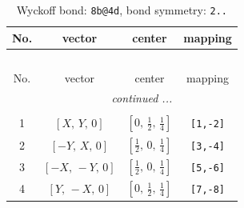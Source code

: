 \documentclass[fleqn,8pt]{jsarticle}
\begin{document}
\renewcommand{\arraystretch}{1.2}
\begin{longtable}{cccc}
\caption{Wyckoff bond: {\tt 8b@4d}, bond symmetry: {\tt 2..}}
 \\
 \hline \hline
No. & vector & center & mapping \\ \hline \endfirsthead

\multicolumn{3}{l}{\tablename\ \thetable{}} \\
 \hline \hline
No. & vector & center & mapping \\ \hline \endhead

 \hline \hline
\multicolumn{3}{r}{\footnotesize\it continued ...} \\ \endfoot

 \hline \hline
\multicolumn{3}{r}{} \\ \endlastfoot

1 & $\left[ X,\, Y,\, 0 \right]$ & $\left[ 0,\, \frac{1}{2},\, \frac{1}{4} \right]$ & {\tt [1,-2]} \\ \hline
2 & $\left[ - Y,\, X,\, 0 \right]$ & $\left[ \frac{1}{2},\, 0,\, \frac{1}{4} \right]$ & {\tt [3,-4]} \\ \hline
3 & $\left[ - X,\, - Y,\, 0 \right]$ & $\left[ \frac{1}{2},\, 0,\, \frac{1}{4} \right]$ & {\tt [5,-6]} \\ \hline
4 & $\left[ Y,\, - X,\, 0 \right]$ & $\left[ 0,\, \frac{1}{2},\, \frac{1}{4} \right]$ & {\tt [7,-8]} \\
\end{longtable}
\renewcommand{\arraystretch}{1.2}
\end{document}
